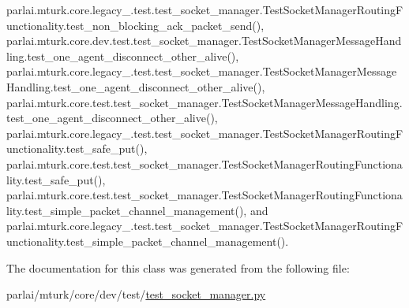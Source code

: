 parlai.\+mturk.\+core.\+legacy\+\_.\+test.\+test\+\_\+socket\+\_\+manager.\+Test\+Socket\+Manager\+Routing\+Functionality.\+test\+\_\+non\+\_\+blocking\+\_\+ack\+\_\+packet\+\_\+send(), parlai.\+mturk.\+core.\+dev.\+test.\+test\+\_\+socket\+\_\+manager.\+Test\+Socket\+Manager\+Message\+Handling.\+test\+\_\+one\+\_\+agent\+\_\+disconnect\+\_\+other\+\_\+alive(), parlai.\+mturk.\+core.\+legacy\+\_.\+test.\+test\+\_\+socket\+\_\+manager.\+Test\+Socket\+Manager\+Message\+Handling.\+test\+\_\+one\+\_\+agent\+\_\+disconnect\+\_\+other\+\_\+alive(), parlai.\+mturk.\+core.\+test.\+test\+\_\+socket\+\_\+manager.\+Test\+Socket\+Manager\+Message\+Handling.\+test\+\_\+one\+\_\+agent\+\_\+disconnect\+\_\+other\+\_\+alive(), parlai.\+mturk.\+core.\+legacy\+\_.\+test.\+test\+\_\+socket\+\_\+manager.\+Test\+Socket\+Manager\+Routing\+Functionality.\+test\+\_\+safe\+\_\+put(), parlai.\+mturk.\+core.\+test.\+test\+\_\+socket\+\_\+manager.\+Test\+Socket\+Manager\+Routing\+Functionality.\+test\+\_\+safe\+\_\+put(), parlai.\+mturk.\+core.\+test.\+test\+\_\+socket\+\_\+manager.\+Test\+Socket\+Manager\+Routing\+Functionality.\+test\+\_\+simple\+\_\+packet\+\_\+channel\+\_\+management(), and parlai.\+mturk.\+core.\+legacy\+\_.\+test.\+test\+\_\+socket\+\_\+manager.\+Test\+Socket\+Manager\+Routing\+Functionality.\+test\+\_\+simple\+\_\+packet\+\_\+channel\+\_\+management().



The documentation for this class was generated from the following file\+:\begin{DoxyCompactItemize}
\item 
parlai/mturk/core/dev/test/\hyperlink{dev_2test_2test__socket__manager_8py}{test\+\_\+socket\+\_\+manager.\+py}\end{DoxyCompactItemize}
